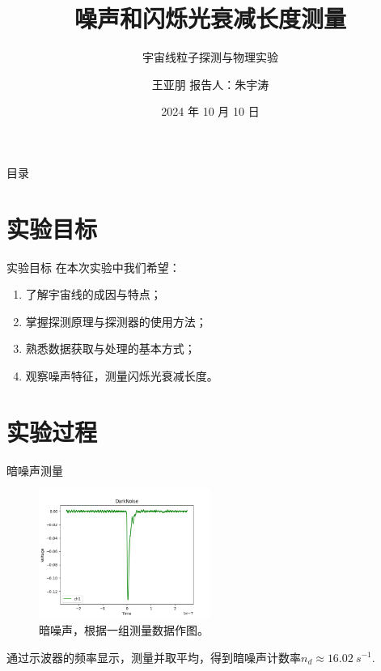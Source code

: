 \documentclass[10pt]{beamer}
\author{王亚朋 \quad 报告人：朱宇涛}
\date{2024 年 10 月 10 日}
\title{噪声和闪烁光衰减长度测量}
\subtitle{宇宙线粒子探测与物理实验}
\begin{document}
\maketitle
\begin{frame}[label={sec:orgc00309b}]{目录}
\tableofcontents
\end{frame}
\section{实验目标}
\label{sec:orge4e0772}
\begin{frame}[label={sec:org8956bac}]{实验目标}
在本次实验中我们希望\cite{高能宇宙线粒子探测:online}：
\begin{enumerate}
\item 了解宇宙线的成因与特点；
\item 掌握探测原理与探测器的使用方法；
\item 熟悉数据获取与处理的基本方式；
\item 观察噪声特征，测量闪烁光衰减长度。
\end{enumerate}
\end{frame}
\section{实验过程}
\label{sec:org8e580e9}
\begin{frame}[label={sec:org675057c}]{暗噪声测量}
\begin{figure}[htbp]
\centering
\includegraphics[width=0.5\textwidth]{../AttenuationLength/figs/DarkNoise.png}
\caption{暗噪声，根据一组测量数据作图。}
\end{figure}

通过示波器的频率显示，测量并取平均，得到暗噪声计数率\(n_d \approx \qty{16.02}{s^{-1}}\).
\end{frame}
\end{document}
